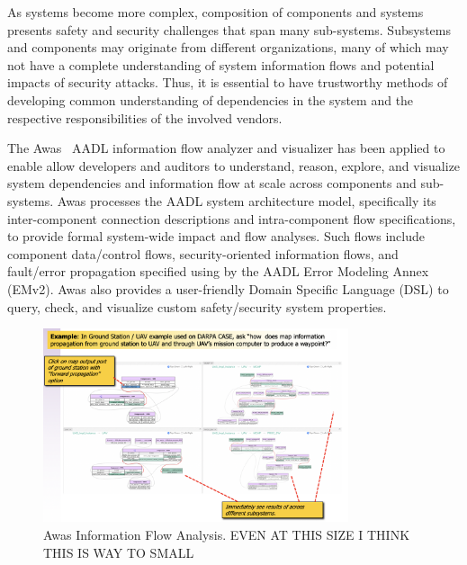 
As systems become more complex, composition of components and 
systems presents safety and security challenges that span
many sub-systems.  Subsystems and components may originate from
different organizations, many of which may not have a complete
understanding of system information flows and potential impacts of
security attacks.  Thus, it is essential to have trustworthy methods
of developing common understanding of dependencies in the system and
the respective responsibilities of the involved vendors.  

The Awas~\cite{awas} AADL information flow analyzer and visualizer has been 
applied to enable allow developers and auditors to understand, reason,
explore, and visualize system dependencies and information flow at
scale across components and sub-systems.  Awas processes the AADL
system architecture model, specifically its inter-component connection
descriptions and intra-component flow specifications, to provide
formal system-wide impact and flow analyses.
Such flows include component data/control flows,
security-oriented information flows, and fault/error propagation
specified using by the AADL Error Modeling Annex (EMv2).
Awas also provides a user-friendly Domain Specific Language (DSL) to 
query, check, and visualize custom safety/security system properties.

\begin{figure}[h]
	\centering
	\includegraphics[width=0.8\textwidth]{figs/CASE-Awas.png}
	\caption{Awas Information Flow Analysis.  EVEN AT THIS SIZE I THINK THIS IS WAY TO SMALL} 
	\label{fig:CASE-Awas} 
\end{figure}

